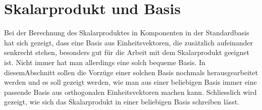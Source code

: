 %
%
%
\section{Skalarprodukt und Basis\label{section:orthonormalbasis}}
Bei der Berechnung des Skalarproduktes in Komponenten in der Standardbasis
hat sich gezeigt, dass eine Basis aus Einheitsvektoren, die zusätzlich
aufeinander senkrecht stehen, besonders gut für die Arbeit mit dem
Skalarprodukt geeignet ist.
Nicht immer hat man allerdings eine solch bequeme Basis.
In diesemAbschnitt sollen die Vorzüge einer solchen Basis nochmals
herausgearbeitet werden und es soll gezeigt werden, wie man aus
einer beliebigen Basis immer eine passende Basis aus orthogonalen
Einheitsvektoren machen kann.
Schliesslich wird gezeigt, wie sich das Skalarprodukt in einer beliebigen
Basis schreiben lässt.

%
%
